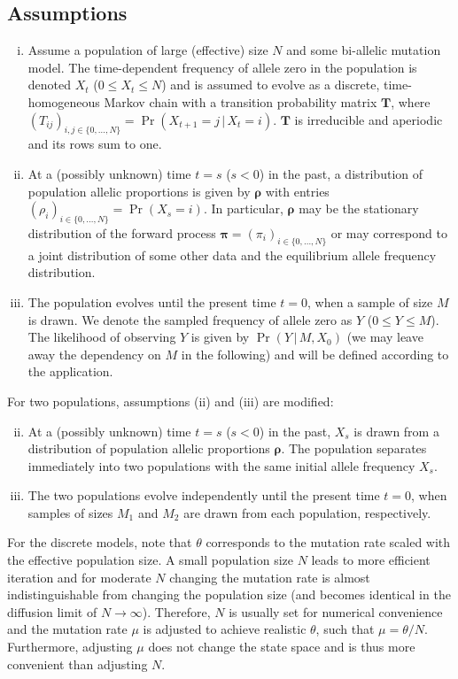 \documentclass[preprint]{elsarticle}
\newcommand{\bs}[1]{\ensuremath{\boldsymbol{#1}}}
\newcommand\given{{\,|\,}}
\newcommand\x[1]{\ensuremath{X_{#1}}}
\newcommand\y{\ensuremath{Y}}
\newcommand\s{\ensuremath{s}}
\begin{document}
\subsection{Assumptions}\label{section:assumptions}
\begin{enumerate}[(i)]
\item Assume a population of large (effective) size $N$ and some bi-allelic mutation model. The time-dependent frequency of allele zero in the population is denoted $\x{t}$ ($0 \le \x{t} \le N$) and is assumed to evolve as a discrete, time-homogeneous Markov chain with a transition probability matrix $\mathbf{T}$, where $(T_{ij})_{i,j \in \{0, \ldots, N\}} = \Pr(\x{t+1}=j \given \x{t}=i)$. $\mathbf{T}$ is irreducible and aperiodic and its rows sum to one.
\item At a (possibly unknown) time $t=\s$ ($\s<0$) in the past, a distribution of population allelic proportions is given by $\bs{\rho}$ with entries $(\rho_{i})_{i \in \{0, \ldots, N\}} = \Pr(\x{\s}=i)$.  In particular, $\bs{\rho}$ may be the stationary distribution of the forward process $\bs{\pi}=(\pi_i)_{i \in \{0, \ldots, N\}}$ or may correspond to a joint distribution of some other data and the equilibrium allele frequency distribution. 
\item The population evolves until the present time $t=0$, when a sample of size $M$ is drawn.  We denote the sampled frequency of allele zero as $\y$ ($0 \le \y \le M$). The likelihood of observing $\y$ is given by $\Pr(\y \given M, \x{0})$ (we may leave away the dependency on $M$ in the following) and will be defined according to the application.
\end{enumerate}

For two populations, assumptions (ii) and (iii) are modified:
\begin{enumerate}[(i)]
\setcounter{enumi}{1}
\item At a (possibly unknown) time $t=\s$ ($\s<0$) in the past,  $\x{\s}$ is drawn from a distribution of population allelic proportions $\bs{\rho}$. The population separates immediately into two populations with the same initial allele frequency $\x{\s}$. 
\item The two populations evolve independently until the present time $t=0$, when samples of sizes $M_1$ and $M_2$ are drawn from each population, respectively.
\end{enumerate}

For the discrete models, note that $\theta$ corresponds to the mutation rate scaled with the effective population size. A small population size $N$ leads to more efficient iteration and for moderate $N$ changing the mutation rate is almost indistinguishable from changing the population size (and becomes identical in the diffusion limit of $N\to\infty$). Therefore, $N$ is usually set for numerical convenience and the mutation rate $\mu$ is adjusted to achieve realistic $\theta$, such that $\mu=\theta/N$. Furthermore, adjusting $\mu$ does not change the state space and is thus more convenient than adjusting $N$.
\end{document}
